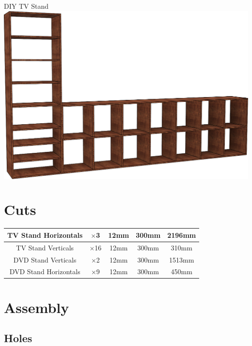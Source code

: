 \documentclass[12pt]{article}
\begin{document}
\begin{centering}
\vspace*{\fill}
{\huge DIY TV Stand}\\[1cm]
\includegraphics[width=\textwidth]{Stand Render.png}
\vspace*{\fill}
\end{centering}
\pagebreak

\section{Cuts}
\begin{tabular}{|c|c|c|c|c|}
\hline
TV Stand Horizontals & $\times$3 & 12mm & 300mm & 2196mm \\\hline
TV Stand Verticals & $\times$16 & 12mm & 300mm & 310mm \\\hline
DVD Stand Verticals & $\times$2 & 12mm & 300mm & 1513mm \\\hline
DVD Stand Horizontals & $\times$9 & 12mm & 300mm & 450mm \\\hline
\end{tabular}

\section{Assembly}

\subsection{Holes}
\end{document}
